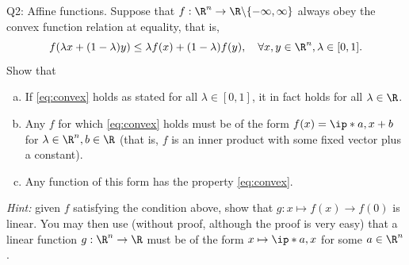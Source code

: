 \documentclass{article}
\theoremstyle{plain}
\theoremstyle{definition}
\theoremstyle{remark}
\begin{document}
\begin{problem}
    {Q2: Affine functions.}
    Suppose that $f:\R^n\rightarrow\R\backslash\{-\infty,\infty\}$ always obey the convex function relation at equality, that is,
    \begin{equation}
        \label{eq:convex}
        f(\lambda x+(1-\lambda)y) \leq \lambda f(x)+(1-\lambda)f(y),\quad \forall x,y\in\R^n,\lambda\in[0,1].
    \end{equation}
    Show that
    \begin{enumerate}[(a)]
        \item If \cref{eq:convex} holds as stated for all $\lambda\in[0,1]$, it in fact holds for all $\lambda\in\R$.\label{item:convex}
        \item Any $f$ for which \cref{eq:convex} holds must be of the form $f(x)=\ip*{a,x}+b$ for $\lambda\in\R^n,b\in\R$ (that is, $f$ is an inner product with some fixed vector plus a constant).
        \item Any function of this form has the property \cref{eq:convex}.
    \end{enumerate}
    \textit{Hint:} given $f$ satisfying the condition above, show that $g:x\mapsto f(x)\rightarrow f(0)$ is linear. You may then use (without proof, although the proof is very easy) that a linear function $g: \R^n \rightarrow \R$ must be of the form $x \mapsto \ip*{a,x}$ for some $a \in \R^n$.
\end{problem}
\end{document}
